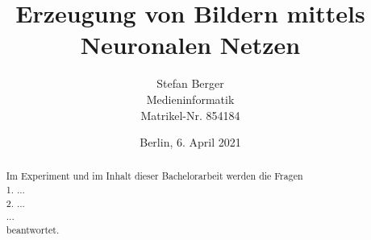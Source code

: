 \titlehead{Berliner Hochschule für Technik Berlin\\Fachbereich VI -- Informatik und Medien}
\subject{Bachelorarbeit}
\title{Erzeugung von Bildern mittels Neuronalen Netzen}
\author{Stefan Berger\\Medieninformatik\\Matrikel-Nr. 854184}
\date{Berlin, 6. April 2021}

\publishers{Betreut von Prof.~Dr.~F.~Gers}


\maketitle

\begin{abstract}
Im Experiment und im Inhalt dieser Bachelorarbeit werden die Fragen \\
1. ...\\
2. ...\\
...\\
beantwortet.
\end{abstract}
